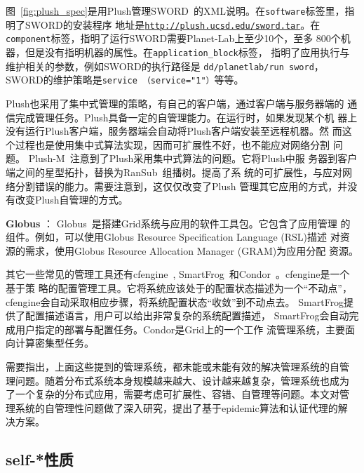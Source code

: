 图~\ref{fig:plush_spec}是用Plush管理SWORD~\cite{sword_worlds,
sword_toit}的XML说明。在\texttt{software}标签里，指明了SWORD的安装程序
地址是\texttt{\url{http://plush.ucsd.edu/sword.tar}}。在
\texttt{component}标签，指明了运行SWORD需要Planet-Lab上至少10个，至多
800个机器，但是没有指明机器的属性。在\texttt{application\_block}标签，
指明了应用执行与维护相关的参数，例如SWORD的执行路径是
\texttt{dd\-/planetlab\-/run sword}，SWORD的维护策略是\texttt{service
（service="1"）}等等。

Plush也采用了集中式管理的策略，有自己的客户端，通过客户端与服务器端的
通信完成管理任务。Plush具备一定的自管理能力。在运行时，如果发现某个机
器上没有运行Plush客户端，服务器端会自动将Plush客户端安装至远程机器。然
而这个过程也是使用集中式算法实现，因而可扩展性不好，也不能应对网络分割
问题。
Plush-M~\cite{plush-m}注意到了Plush采用集中式算法的问题。它将Plush中服
务器到客户端之间的星型拓扑，替换为RanSub~\cite{ransub}组播树。提高了系
统的可扩展性，与应对网络分割错误的能力。需要注意到，这仅仅改变了Plush
管理其它应用的方式，并没有改变Plush自管理的方式。

\textbf{Globus} ：
Globus~\cite{globus}是搭建Grid系统与应用的软件工具包。它包含了应用管理
的组件。例如，可以使用Globus Resource Specification Language (RSL)描述
对资源的需求，使用Globus Resource Allocation Manager (GRAM)为应用分配
资源。

其它一些常见的管理工具还有cfengine~\cite{cfengine},
SmartFrog~\cite{smartfrog}和Condor~\cite{condor}。cfengine是一个基于策
略的配置管理工具。它将系统应该处于的配置状态描述为一个“不动点”，
cfengine会自动采取相应步骤，将系统配置状态“收敛”到不动点去。
SmartFrog提供了配置描述语言，用户可以给出非常复杂的系统配置描述，
SmartFrog会自动完成用户指定的部署与配置任务。Condor是Grid上的一个工作
流管理系统，主要面向计算密集型任务。

需要指出，上面这些提到的管理系统，都未能或未能有效的解决管理系统的自管
理问题。随着分布式系统本身规模越来越大、设计越来越复杂，管理系统也成为
了一个复杂的分布式应用，需要考虑可扩展性、容错、自管理等问题。本文对管
理系统的自管理性问题做了深入研究，提出了基于epidemic算法和认证代理的解
决方案。




\subsection{self-*性质}
\label{sec:related:selfstart}


